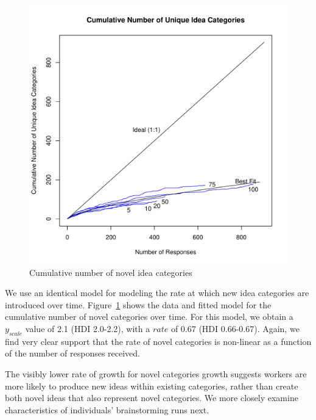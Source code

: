\begin{figure}[h!]
    \centering
    \includegraphics[width=0.9\columnwidth]{cumulative_categories}
    \caption{Cumulative number of novel idea categories}
    \label{fig:cumulative_categories}
\end{figure}


We use an identical model for modeling the rate at which new idea categories are introduced over time. Figure~\ref{fig:cumulative_categories} shows the data and fitted model for the cumulative number of novel categories over time. For this model, we obtain a $y_{scale}$ value of 2.1 (HDI 2.0-2.2), with a $rate$ of 0.67 (HDI 0.66-0.67). Again, we find very clear support that the rate of novel categories is non-linear as a function of the number of responses received.

The visibly lower rate of growth for novel categories growth suggests workers are more likely to produce new ideas within existing categories, rather than create both novel ideas that also represent novel categories. We more closely examine characteristics of individuals' brainstorming runs next.

